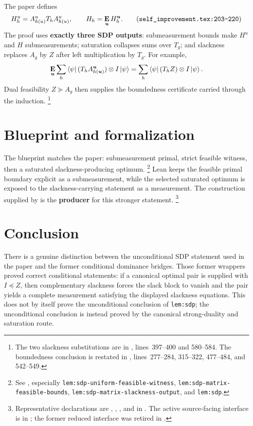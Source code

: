 \documentclass[11pt]{article}
\begin{document}
The paper defines
\[
  H^u_h=A^u_{h(u)}T_hA^u_{h(u)},
  \qquad
  H_h=\E_{\bu}H^{\bu}_h.
  \tag{\texttt{self\_improvement.tex:203--220}}
\]
The proof uses \textbf{exactly three SDP outputs}: submeasurement bounds make
$H^u$ and $H$ submeasurements; saturation collapses sums over $T_g$; and
slackness replaces $A_g$ by $Z$ after left multiplication by $T_g$.  For example,
\[
  \mathop{\bf E\/}_{\boldsymbol{u}}\sum_h\bra{\psi}(T_hA^{\boldsymbol{u}}_{h(\boldsymbol{u})})\otimes I\ket{\psi}
  =\sum_h\bra{\psi}(T_hZ)\otimes I\ket{\psi}.
\]
Dual feasibility $Z\succeq A_g$ then supplies the boundedness certificate carried
through the induction.%
\footnote{The two slackness substitutions are in
, lines~397--400 and 580--584.
The boundedness conclusion is restated in
, lines~277--284, 315--322,
477--484, and 542--549.}

\section{Blueprint and formalization}

The blueprint matches the paper: submeasurement primal, strict feasible witness,
then a saturated slackness-producing optimum.%
\footnote{See , especially
\texttt{lem:sdp-uniform-feasible-witness},
\texttt{lem:sdp-matrix-feasible-bounds},
\texttt{lem:sdp-matrix-slackness-output}, and \texttt{lem:sdp}.}
Lean keeps the feasible primal boundary explicit as a submeasurement, while the
selected saturated optimum is exposed to the slackness-carrying statement as a
measurement.  The construction supplied by  is the \textbf{producer}
for this stronger statement.%
\footnote{Representative declarations are ,
, , and
 in
.  The active source-facing
interface is  in
; the former
reduced  interface was retired in .}

\section{Conclusion}

There is a genuine distinction between the unconditional SDP statement used in
the paper and the former conditional dominance bridges.  Those former wrappers
proved correct conditional statements: if a canonical optimal pair is supplied
with $I\preceq Z$, then complementary slackness forces the slack block to vanish
and the pair yields a complete measurement satisfying the displayed slackness
equations.  This does not by itself prove the unconditional conclusion of
\texttt{lem:sdp}; the unconditional conclusion is instead proved by the
canonical strong-duality and saturation route.
\end{document}
